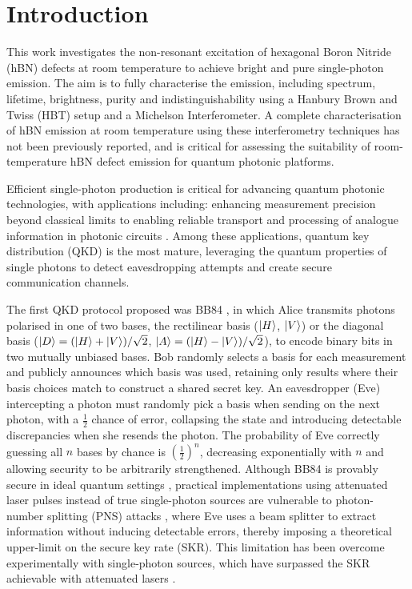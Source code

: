 \section{Introduction}

This work investigates the non-resonant excitation of hexagonal Boron Nitride (hBN) defects at room temperature to achieve bright and pure single-photon emission. The aim is to fully characterise the emission, including spectrum, lifetime, brightness, purity and indistinguishability using a Hanbury Brown and Twiss (HBT) setup and a Michelson Interferometer. A complete characterisation of hBN emission at room temperature using these interferometry techniques has not been previously reported, and is critical for assessing the suitability of room-temperature hBN defect emission for quantum photonic platforms.

Efficient single-photon production is critical for advancing quantum photonic technologies, with applications including: enhancing measurement precision beyond classical limits \cite{Nagata2007, Vitelli2010} to enabling reliable transport and processing of analogue information in photonic circuits \cite{Bogaerts2020}. Among these applications, quantum key distribution (QKD) is the most mature, leveraging the quantum properties of single photons to detect eavesdropping attempts and create secure communication channels. 

The first QKD protocol proposed was BB84 \cite{Bennett2014}, in which Alice transmits photons polarised in one of two bases, the rectilinear basis ($\ket{H}$, $\ket{V}$) or the diagonal basis ($\ket{D}=(\ket{H}+\ket{V})/\sqrt{2}$, $\ket{A}=(\ket{H}-\ket{V})/\sqrt{2}$), to encode binary bits in two mutually unbiased bases. Bob randomly selects a basis for each measurement and publicly announces which basis was used, retaining only results where their basis choices match to construct a shared secret key. An eavesdropper (Eve) intercepting a photon must randomly pick a basis when sending on the next photon, with a $\frac{1}{2}$ chance of error, collapsing the state and introducing detectable discrepancies when she resends the photon. The probability of Eve correctly guessing all $n$ bases by chance is $\left(\frac{1}{2}\right)^n$, decreasing exponentially with $n$ and allowing security to be arbitrarily strengthened. Although BB84 is provably secure in ideal quantum settings \cite{Shor2000}, practical implementations using attenuated laser pulses instead of true single-photon sources are vulnerable to photon-number splitting (PNS) attacks \cite{Ashkenazy2024}, where Eve uses a beam splitter to extract information without inducing detectable errors, thereby imposing a theoretical upper-limit on the secure key rate (SKR). This limitation has been overcome experimentally with single-photon sources, which have surpassed the SKR achievable with attenuated lasers \cite{Zhang2025}.



